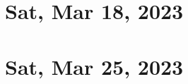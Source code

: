 \documentclass[a4paper]{report}
\institute{Institute Name}
\date{Based on lectures by \profloc{} in 2023
\\~\\ Draft updated on \today}
\begin{document}
\renewcommand\thepage{Title}
\maketitle
\renewcommand\thepage{Preface} 

\newpage
\pagestyle{plain}
\setcounter{tocdepth}{0}
\tableofcontents
\newpage
\pagestyle{head}

\chapter{Sat, Mar 18, 2023}

\chapter{Sat, Mar 25, 2023}



\end{document}
